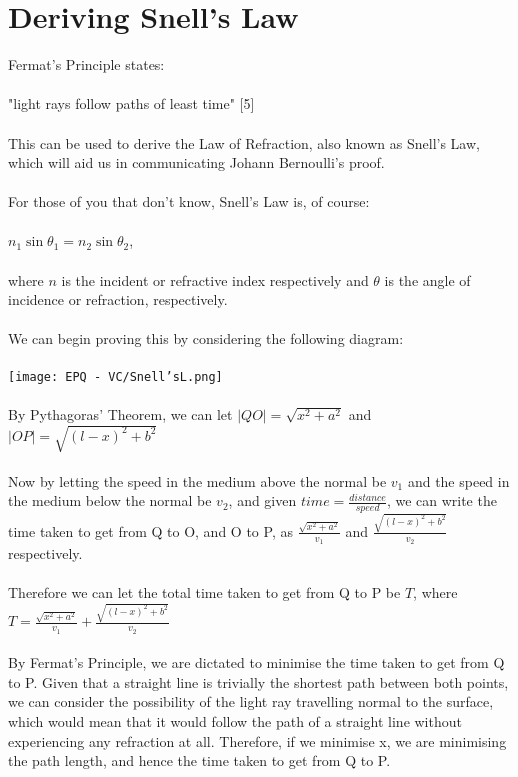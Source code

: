 \documentclass[12pt]{report}
\begin{document}
\section{Deriving Snell's Law}
Fermat's Principle states:
\\
\\
"light rays follow paths of least time" [5]
\\
\\
This can be used to derive the Law of Refraction, also known as Snell's Law, which will aid us in communicating Johann Bernoulli's proof.
\\
\\
For those of you that don't know, Snell's Law is, of course:
\\
\\
\(n_{1} \sin{\theta_{1}} = n_{2} \sin{\theta_{2}}\),
\\
\\
where \(n\) is the incident or refractive index respectively and \(\theta\) is the angle of incidence or refraction, respectively.
\\
\\
We can begin proving this by considering the following diagram:
\\
\\
\texttt{[image: EPQ - VC/Snell'sL.png]}
\\
\\
By Pythagoras' Theorem, we can let \(|QO|= \sqrt{x^2 + a^2}\) and \(|OP| = \sqrt{(l-x)^2+b^2}\)
\\
\\
Now by letting the speed in the medium above the normal be \(v_{1}\) and the speed in the medium below the normal be \(v_{2}\), and given \(time=\frac{distance}{speed}\), we can write the time taken to get from Q to O, and O to P, as \(\frac{\sqrt{x^2 + a^2}}{v_{1}}\) and \(\frac{\sqrt{(l-x)^2+b^2}}{v_{2}}\) respectively.
\\
\\
Therefore we can let the total time taken to get from Q to P be \(T\), where \(T=\frac{\sqrt{x^2 + a^2}}{v_{1}}+\frac{\sqrt{(l-x)^2+b^2}}{v_{2}}\)
\\
\\
By Fermat's Principle, we are dictated to minimise the time taken to get from Q to P. Given that a straight line is trivially the shortest path between both points, we can consider the possibility of the light ray travelling normal to the surface, which would mean that it would follow the path of a straight line without experiencing any refraction at all. Therefore, if we minimise x, we are minimising the path length, and hence the time taken to get from Q to P.
\end{document}
